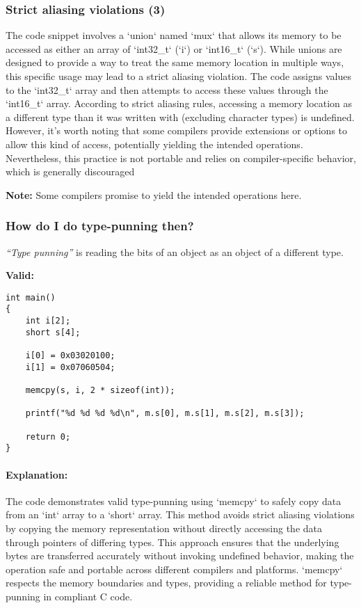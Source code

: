 \documentclass[12pt]{article}
\begin{document}
\subsubsection{Strict aliasing violations (3)}

The code snippet involves a `union` named `mux` that allows its memory to be accessed as either an array of `int32\_t` (`i`) or `int16\_t` (`s`). While unions are designed to provide a way to treat the same memory location in multiple ways, this specific usage may lead to a strict aliasing violation. The code assigns values to the `int32\_t` array and then attempts to access these values through the `int16\_t` array. According to strict aliasing rules, accessing a memory location as a different type than it was written with (excluding character types) is undefined. However, it's worth noting that some compilers provide extensions or options to allow this kind of access, potentially yielding the intended operations. Nevertheless, this practice is not portable and relies on compiler-specific behavior, which is generally discouraged

\textbf{Note:} Some compilers promise to yield the intended operations here.

\subsubsection{How do I do type-punning then?}

\textit{``Type punning''} is reading the bits of an object as an object of a different type.

\textbf{Valid:}

\begin{lstlisting}
int main()
{
    int i[2];
    short s[4];

    i[0] = 0x03020100;
    i[1] = 0x07060504;

    memcpy(s, i, 2 * sizeof(int));

    printf("%d %d %d %d\n", m.s[0], m.s[1], m.s[2], m.s[3]);

    return 0;
}
\end{lstlisting}

\paragraph{Explanation:}
The code demonstrates valid type-punning using `memcpy` to safely copy data from an `int` array to a `short` array. This method avoids strict aliasing violations by copying the memory representation without directly accessing the data through pointers of differing types. This approach ensures that the underlying bytes are transferred accurately without invoking undefined behavior, making the operation safe and portable across different compilers and platforms. `memcpy` respects the memory boundaries and types, providing a reliable method for type-punning in compliant C code.
\end{document}
